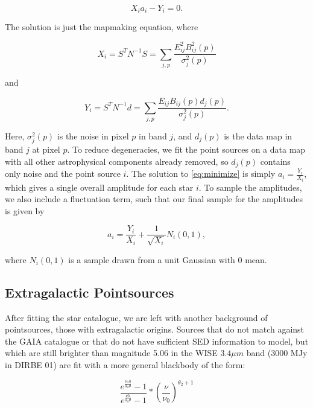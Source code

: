 \documentclass{aa}
\begin{document}
\begin{equation}
\label{eq:minimize}
X_ia_i - Y_i = 0.
\end{equation}

The solution is just the mapmaking equation, where

\begin{equation}
X_i = S^T N^{-1} S = \sum_{j,p}\frac{E_{ij}^2 B^2_{ij}(p)}{\sigma_j^2(p)} 
\end{equation}

and

\begin{equation}
Y_i = S^TN^{-1}d = \sum_{j,p} \frac{E_{ij}B_{ij}(p) d_j(p)}{\sigma_j^2(p)}.
\end{equation}

Here, $\sigma_j^2(p)$ is the noise in pixel $p$ in band $j$, and $d_j(p)$ is the data map in band $j$ at pixel $p$. To reduce degeneracies, we fit the point sources on a data map with all other astrophysical components already removed, so $d_j(p)$ contains only noise and the point source $i$. The solution to \ref{eq:minimize} is simply $a_i = \frac{Y_i}{X_i}$, which gives a single overall amplitude for each star $i$. To sample the amplitudes, we also include a fluctuation term, such that our final sample for the amplitudes is given by

\begin{equation}
a_i = \frac{Y_i}{X_i} + \frac{1}{\sqrt{X_i}} N_i(0,1),
\end{equation}

where $N_i(0,1)$ is a sample drawn from a unit Gaussian with 0 mean.

\subsection{Extragalactic Pointsources}

\label{sec:extragalacticmodel}

After fitting the star catalogue, we are left with another background of pointsources, those with extragalactic origins. Sources that do not match against the GAIA catalogue or that do not have sufficient SED information to model, but which are still brighter than magnitude 5.06 in the WISE $3.4 \mu m$ band ($3000$ MJy in DIRBE 01) are fit with a more general blackbody of the form:

\begin{equation}
\frac{e^{\frac{\nu_0 h}{k_b \theta}} - 1}{e^{\frac{\nu h}{k_b \theta}} - 1} * (\frac{\nu}{\nu_0})^{\theta_2 + 1}
\end{equation}
\end{document}
